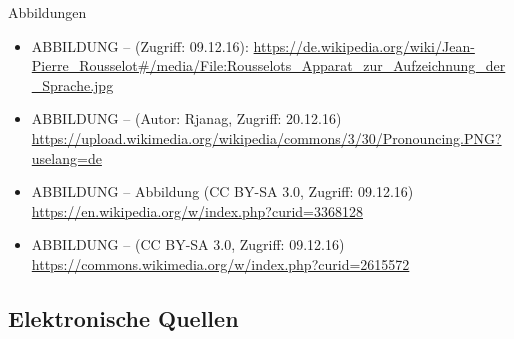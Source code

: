 \begin{frame}[allowframebreaks]{Abbildungen}
	\footnotesize
		
		\begin{itemize}
			\item ABBILDUNG --  (Zugriff: 09.12.16): \url{https://de.wikipedia.org/wiki/Jean-Pierre\_Rousselot\#/media/File:Rousselots\_Apparat\_zur\_Aufzeichnung\_der\_Sprache.jpg}

			\item ABBILDUNG --  (Autor: Rjanag, Zugriff: 20.12.16) \url{https://upload.wikimedia.org/wikipedia/commons/3/30/Pronouncing.PNG?uselang=de}

			\item ABBILDUNG -- Abbildung  (CC BY-SA 3.0, Zugriff: 09.12.16) \url{https://en.wikipedia.org/w/index.php?curid=3368128}

			\item ABBILDUNG --  (CC BY-SA 3.0, Zugriff: 09.12.16) \url{https://commons.wikimedia.org/w/index.php?curid=2615572}
		\end{itemize}	
	
\end{frame}


\subsection*{Elektronische Quellen}


